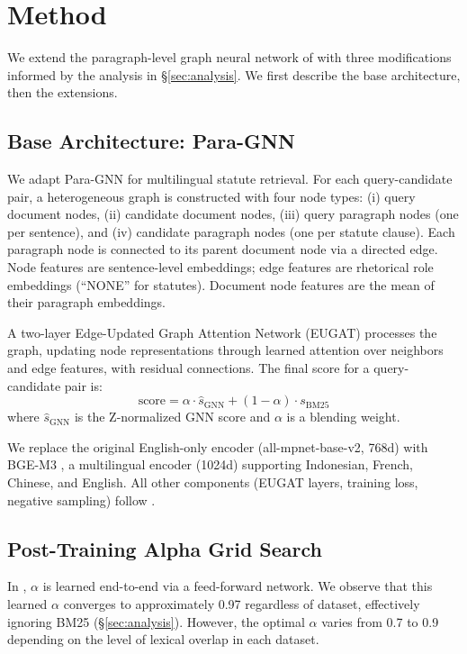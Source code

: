 \section{Method}
\label{sec:method}

We extend the paragraph-level graph neural network of \citet{ilpcsr} with three modifications informed by the analysis in \S\ref{sec:analysis}. We first describe the base architecture, then the extensions.

\subsection{Base Architecture: Para-GNN}
\label{sec:base}

We adapt Para-GNN \citep{ilpcsr} for multilingual statute retrieval. For each query-candidate pair, a heterogeneous graph is constructed with four node types: (i) query document nodes, (ii) candidate document nodes, (iii) query paragraph nodes (one per sentence), and (iv) candidate paragraph nodes (one per statute clause). Each paragraph node is connected to its parent document node via a directed edge. Node features are sentence-level embeddings; edge features are rhetorical role embeddings (``NONE'' for statutes). Document node features are the mean of their paragraph embeddings.

A two-layer Edge-Updated Graph Attention Network (EUGAT) processes the graph, updating node representations through learned attention over neighbors and edge features, with residual connections. The final score for a query-candidate pair is:
\begin{equation}
\text{score} = \alpha \cdot \hat{s}_{\text{GNN}} + (1-\alpha) \cdot s_{\text{BM25}}
\label{eq:score}
\end{equation}
where $\hat{s}_{\text{GNN}}$ is the Z-normalized GNN score and $\alpha$ is a blending weight.

We replace the original English-only encoder (all-mpnet-base-v2, 768d) with BGE-M3 \citep{bgem3}, a multilingual encoder (1024d) supporting Indonesian, French, Chinese, and English. All other components (EUGAT layers, training loss, negative sampling) follow \citet{ilpcsr}.

\subsection{Post-Training Alpha Grid Search}
\label{sec:alpha}

In \citet{ilpcsr}, $\alpha$ is learned end-to-end via a feed-forward network. We observe that this learned $\alpha$ converges to approximately 0.97 regardless of dataset, effectively ignoring BM25 (\S\ref{sec:analysis}). However, the optimal $\alpha$ varies from 0.7 to 0.9 depending on the level of lexical overlap in each dataset.


